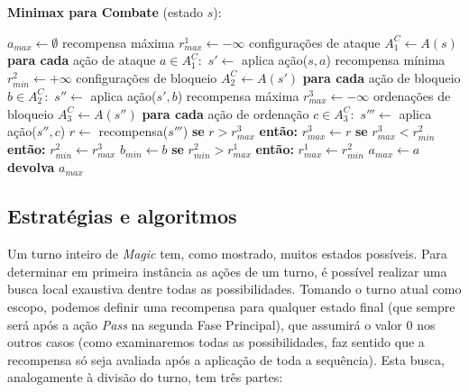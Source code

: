 \begin{algorithm}
\caption*{\textbf{Minimax para Combate} (estado $s$):}
\begin{algorithmic}
  \STATE $a_{max} \gets \emptyset$
  \STATE recompensa máxima $r^1_{max} \gets -\infty$
  \STATE configurações de ataque $A^C_1 \gets A(s)$
  \STATE \textbf{para cada} ação de ataque $a \in A^C_1:$
    \STATE \ind $s' \gets $ aplica ação($s, a$)
    \STATE \ind recompensa mínima $r^2_{min} \gets +\infty$
    \STATE \ind configurações de bloqueio $A^C_2 \gets A(s')$
    \STATE
    \STATE \ind \textbf{para cada} ação de bloqueio $b \in A^C_2:$
      \STATE \ind \ind $s'' \gets $ aplica ação($s', b$)
      \STATE \ind \ind recompensa máxima $r^3_{max} \gets -\infty$
      \STATE \ind \ind ordenações de bloqueio $A^C_3 \gets A(s'')$
      \STATE
      \STATE \ind \ind \textbf{para cada} ação de ordenação $c \in A^C_3:$
        \STATE \ind \ind \ind $s'''\gets $ aplica ação($s'', c$)
        \STATE \ind \ind \ind $r \gets $ recompensa($s'''$)
        \STATE \ind \ind \ind \textbf{se } $r > r^3_{max}$ \textbf{então: }
        \STATE \ind \ind \ind \ind $r^3_{max} \gets r$
      \STATE
      \STATE \ind \ind \textbf{se } $r^3_{max} < r^2_{min}$ \textbf{então: }
      \STATE \ind \ind \ind $r^2_{min} \gets r^3_{max}$
      \STATE \ind \ind \ind $b_{min} \gets b$
    \STATE
    \STATE \ind \textbf{se } $r^2_{min} > r^1_{max}$ \textbf{então: }
    \STATE \ind \ind $r^1_{max} \gets r^2_{min}$
    \STATE \ind \ind $a_{max} \gets a$
    \STATE
    \STATE \textbf{devolva } $a_{max}$
\end{algorithmic}
\end{algorithm}

\subsection{Estratégias e algoritmos}

Um turno inteiro de \textit{Magic} tem, como mostrado, muitos estados possíveis. Para determinar
em primeira instância as ações de um turno, é possível realizar uma busca local exaustiva dentre todas as
possibilidades. Tomando o turno atual como escopo, podemos definir uma recompensa para qualquer
estado final (que sempre será após a ação \textit{Pass} na segunda Fase Principal), que assumirá o valor 0
nos outros casos (como examinaremos todas as possibilidades, faz sentido que a recompensa só seja avaliada
após a aplicação de toda a sequência). Esta busca, analogamente à divisão do turno, tem três partes:

